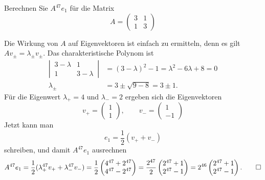 Berechnen Sie $A^{47}e_1$ für die Matrix
\[
A=\begin{pmatrix}
3&1\\
1&3
\end{pmatrix}
\]

\begin{loesung}
Die Wirkung von $A$ auf Eigenvektoren ist einfach zu ermitteln,
denn es gilt $Av_{\pm}=\lambda_{\pm}v_{\pm}$.
Das charakteristische Polynom ist
\begin{align*}
\left|\,\begin{matrix}3-\lambda&1\\1&3-\lambda\end{matrix}\,\right|
&=
(3-\lambda)^2-1=\lambda^2-6\lambda+8=0
\\
\lambda_{\pm}&=3\pm\sqrt{9-8}=3\pm1.
\end{align*}
Für die Eigenwert $\lambda_+=4$ und $\lambda_-=2$ ergeben sich die
Eigenvektoren
\[
v_+=\begin{pmatrix}1\\1\end{pmatrix},\qquad
v_-=\begin{pmatrix}1\\-1\end{pmatrix}
\]
Jetzt kann man
\[
e_1=\frac12(v_++v_-)
\]
schreiben, und damit $A^{47}e_1$ ausrechnen
\[
A^{47}e_1=\frac12( \lambda_+^{47}v_++\lambda_-^{47}v_-)
=\frac12\begin{pmatrix}
4^{47}+2^{47}\\
4^{47}-2^{47}
\end{pmatrix}
=\frac{2^{47}}2\begin{pmatrix}
2^{47}+1\\
2^{47}-1
\end{pmatrix}
=2^{46}\begin{pmatrix}
2^{47}+1\\
2^{47}-1
\end{pmatrix}.
\qedhere
\]
\end{loesung}

